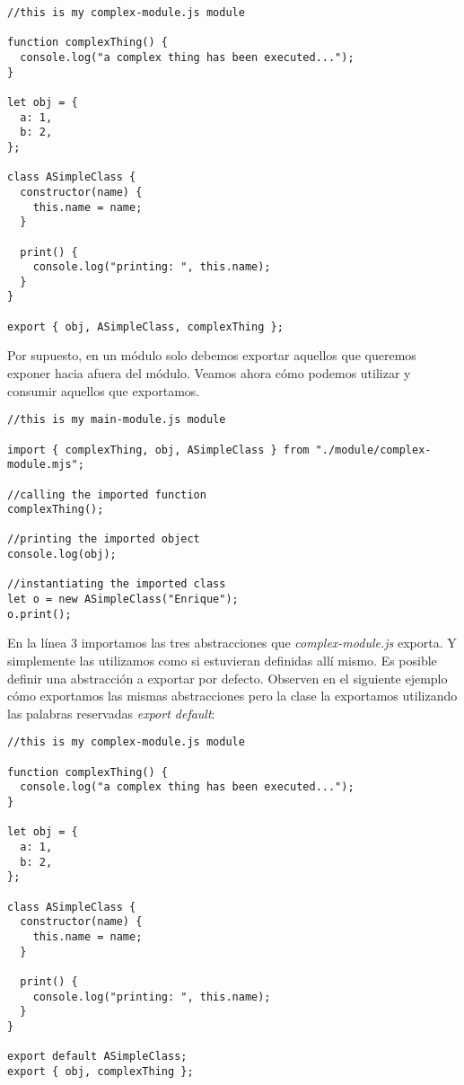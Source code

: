 \documentclass[a4paper, oneside, titlepage, 12pt]{paper}
\begin{document}
\begin{verbatim}
//this is my complex-module.js module

function complexThing() {
  console.log("a complex thing has been executed...");
}

let obj = {
  a: 1,
  b: 2,
};

class ASimpleClass {
  constructor(name) {
    this.name = name;
  }

  print() {
    console.log("printing: ", this.name);
  }
}

export { obj, ASimpleClass, complexThing };
\end{verbatim}

Por supuesto, en un módulo solo debemos exportar aquellos que queremos exponer hacia afuera del módulo. Veamos ahora cómo podemos utilizar y consumir aquellos que exportamos.

\begin{verbatim}
//this is my main-module.js module

import { complexThing, obj, ASimpleClass } from "./module/complex-module.mjs";

//calling the imported function
complexThing();

//printing the imported object
console.log(obj);

//instantiating the imported class
let o = new ASimpleClass("Enrique");
o.print();
\end{verbatim}

En la línea 3 importamos las tres abstracciones que \textit{complex-module.js} exporta. Y simplemente las utilizamos como si estuvieran definidas allí mismo. Es posible definir una abstracción a exportar por defecto. Observen en el siguiente ejemplo cómo exportamos las mismas abstracciones pero la clase la exportamos utilizando las palabras reservadas \textit{export default}:

\begin{verbatim}
//this is my complex-module.js module

function complexThing() {
  console.log("a complex thing has been executed...");
}

let obj = {
  a: 1,
  b: 2,
};

class ASimpleClass {
  constructor(name) {
    this.name = name;
  }

  print() {
    console.log("printing: ", this.name);
  }
}

export default ASimpleClass;
export { obj, complexThing };
\end{verbatim}
\end{document}
